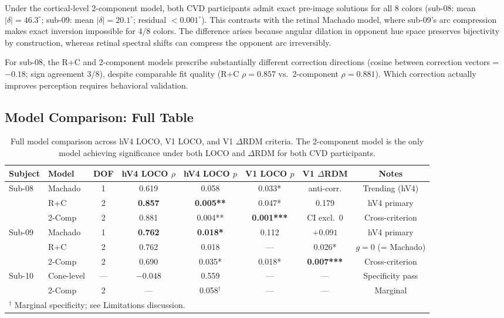 \documentclass{article}
\begin{document}
Under the cortical-level 2-component model, both CVD participants admit exact pre-image solutions for all 8 colors (sub-08: mean $|\delta| = 46.3^\circ$; sub-09: mean $|\delta| = 20.1^\circ$; residual $< 0.001^\circ$).
This contrasts with the retinal Machado model, where sub-09's arc compression makes exact inversion impossible for 4/8 colors.
The difference arises because angular dilation in opponent hue space preserves bijectivity by construction, whereas retinal spectral shifts can compress the opponent arc irreversibly.

For sub-08, the R+C and 2-component models prescribe substantially different correction directions (cosine between correction vectors = $-0.18$; sign agreement 3/8), despite comparable fit quality (R+C $\rho = 0.857$ vs.\ 2-component $\rho = 0.881$).
Which correction actually improves perception requires behavioral validation.

\subsection{Model Comparison: Full Table}

\begin{table}[h]
  \caption{Full model comparison across hV4 LOCO, V1 LOCO, and V1 $\Delta$RDM criteria. The 2-component model is the only model achieving significance under both LOCO and $\Delta$RDM for both CVD participants.}
  \label{tab:full}
  \begin{center}
    \begin{small}
      \begin{tabular}{llcccccc}
        \toprule
        Subject & Model & DOF & hV4 LOCO $\rho$ & hV4 LOCO $p$ & V1 LOCO $p$ & V1 $\Delta$RDM & Notes \\
        \midrule
        \multirow{3}{*}{Sub-08} & Machado & 1 & 0.619 & 0.058 & 0.033* & anti-corr. & Trending (hV4) \\
        & R+C & 2 & \textbf{0.857} & \textbf{0.005**} & 0.047* & 0.179 & hV4 primary \\
        & 2-Comp & 2 & 0.881 & 0.004** & \textbf{0.001***} & CI excl.\ 0 & Cross-criterion \\
        \midrule
        \multirow{3}{*}{Sub-09} & Machado & 1 & \textbf{0.762} & \textbf{0.018*} & 0.112 & $+0.091$ & hV4 primary \\
        & R+C & 2 & 0.762 & 0.018 & --- & 0.026* & $g{=}0$ (= Machado) \\
        & 2-Comp & 2 & 0.690 & 0.035* & 0.018* & \textbf{0.007***} & Cross-criterion \\
        \midrule
        Sub-10 & Cone-level & --- & $-0.048$ & 0.559 & --- & --- & Specificity pass \\
        & 2-Comp & 2 & --- & 0.058$^\dagger$ & --- & --- & Marginal \\
        \bottomrule
        \multicolumn{8}{l}{\small $^\dagger$ Marginal specificity; see Limitations discussion.} \\
      \end{tabular}
    \end{small}
  \end{center}
\end{table}
\end{document}
